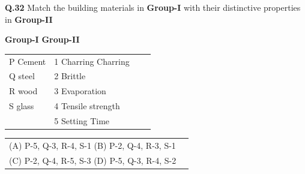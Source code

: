 \documentclass[journal,12pt,onecolumn]{IEEEtran}
\theoremstyle{remark}
\begin{document}
\vspace{0.5cm}

\textbf{Q.32} Match the building materials in \textbf{Group-I} with their distinctive properties in \textbf{Group-II}

\vspace{4pt}

\vspace{4pt}

\hspace{3cm}  \textbf{Group-I}\hspace{8cm} \textbf{Group-II} \\
\vspace{0.15cm}
\begin{tabular}{llcl}
\vspace{0.15cm}

\hspace{2cm} P \hspace{0.3cm}  Cement    &\hspace{7Cm} 1 Charring Charring\hspace{0.3cm}    \\
\vspace{0.15cm}
\hspace{2cm} Q  \hspace{0.3cm} steel      &\hspace{7cm} 2 Brittle \hspace{0.3cm}               \\
\vspace{0.15cm}
    \hspace{2cm} R  \hspace{0.3cm} wood      &\hspace{7cm} 3      Evaporation   \hspace{0.3cm }\\
    \vspace{0.15cm}
    \hspace{2cm}  S  \hspace{0.3cm}   glass   &\hspace{7cm} 4 Tensile strength \\
                       &\hspace{7cm}  5  Setting Time

    
\end{tabular}
\vspace{0.15cm}

 \bigskip
 
\begin{tabular}{ll}
\hspace{2cm}(A)  P-5, Q-3, R-4, S-1
\hspace{4cm}(B)  P-2, Q-4, R-3, S-1 \\  \vspace{0.5cm}
\hspace{2cm}(C)  P-2, Q-4, R-5, S-3 
\hspace{4cm}(D)  P-5, Q-3, R-4, S-2 
\end{tabular}
\end{document}
